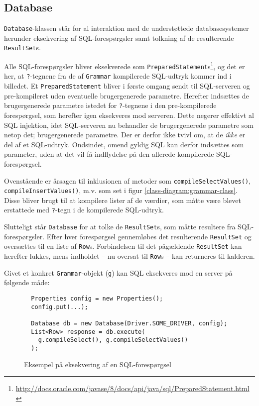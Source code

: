 \subsection{Database}

\texttt{Database}-klassen står for al interaktion med de understøttede databasesystemer herunder eksekvering af SQL-forespørgsler samt tolkning af de resulterende \texttt{ResultSet}s.

Alle SQL-forespørgsler bliver eksekverede som \texttt{Prepared\-Statement}s\footnote{\url{http://docs.oracle.com/javase/8/docs/api/java/sql/PreparedStatement.html}}, og det er her, at \texttt{?}-tegnene fra de af \texttt{Grammar} kompilerede SQL-udtryk kommer ind i billedet. Et \texttt{Prepared\-Statement} bliver i første omgang sendt til SQL-serveren og pre-kompileret uden eventuelle brugergenerede parametre. Herefter indsættes de brugergenerede parametre istedet for \texttt{?}-tegnene i den pre-kompilerede forespørgsel, som herefter igen eksekveres mod serveren. Dette negerer effektivt al SQL injektion, idet SQL-serveren nu behandler de brugergenerede parametre som netop det; brugergenerede parametre. Der er derfor ikke tvivl om, at de \textit{ikke} er del af et SQL-udtryk. Ondsindet, omend gyldig SQL kan derfor indsættes som parameter, uden at det vil få indflydelse på den allerede kompilerede SQL-forespørgsel.

Ovenstående er årsagen til inklusionen af metoder som \texttt{compile\-Select\-Values()}, \texttt{compile\-Insert\-Values()}, m.v. som set i figur \ref{class-diagram:grammar-class}. Disse bliver brugt til at kompilere lister af de værdier, som måtte være blevet erstattede med \texttt{?}-tegn i de kompilerede SQL-udtryk.

Slutteligt står \texttt{Database} for at tolke de \texttt{Result\-Set}s, som måtte resultere fra SQL-forespørgsler. Efter hver forespørgsel gennemløbes det resulterende \texttt{Result\-Set} og oversættes til en liste af \texttt{Row}s. Forbindelsen til det pågældende \texttt{Result\-Set} kan herefter lukkes, mens indholdet – nu oversat til \texttt{Row}s – kan returneres til kalderen.

Givet et konkret \texttt{Grammar}-objekt (\texttt{g}) kan SQL eksekveres mod en server på følgende måde:

\begin{figure}[h]
  \begin{verbatim}
  Properties config = new Properties();
  config.put(...);
  
  Database db = new Database(Driver.SOME_DRIVER, config);
  List<Row> response = db.execute(
    g.compileSelect(), g.compileSelectValues()
  );
  \end{verbatim}
  \caption{Eksempel på eksekvering af en SQL-forespørgsel}
  \label{code-example:sql-execution}
\end{figure}

